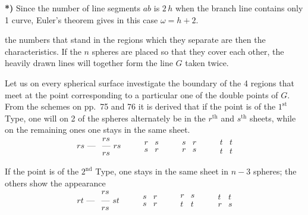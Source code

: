 \documentclass{article}
\begin{document}
\textbf{*)} Since the number of line segments $ab$ is $2\,h$ when the branch line contains only 1 curve, Euler's theorem gives in this case $\omega = h + 2$.

the numbers that stand in the regions which they separate are then the characteristics. If the $n$ spheres are placed so that they cover each other, the heavily drawn lines will together form the line $G$ taken twice.

Let us on every spherical surface investigate the boundary of the 4 regions that meet at the point corresponding to a particular one of the double points of $G$. From the schemes on pp.\ 75 and 76 it is derived that if the point is of the $1^{\text{st}}$ Type, one will on 2 of the spheres alternately be in the $r^{\text{th}}$ and $s^{\text{th}}$ sheets, while on the remaining ones one stays in the same sheet.
\[
\begin{array}{c|c}
& rs \\
rs\text{ ---} & \text{--- } rs \\
& rs
\end{array}
\qquad
\begin{array}{c||c}
r & s \\
\hline\hline
s & r
\end{array}
\qquad
\begin{array}{c||c}
s & r \\
\hline\hline
r & s
\end{array}
\qquad
\begin{array}{c|c}
t & t \\
\hline
t & t
\end{array}
\]

If the point is of the $2^{\text{nd}}$ Type, one stays in the same sheet in $n-3$ spheres; the others show the appearance
\[
\begin{array}{c|c}
& rs \\
rt\text{ ---} & \text{--- } st \\
& rs
\end{array}
\qquad
\begin{array}{c||c}
s & r \\
\hline
s & r
\end{array}
\qquad
\begin{array}{c|c}
r & s \\
\hline\hline
t & t
\end{array}
\qquad
\begin{array}{c|c}
t & t \\
\hline\hline
r & s
\end{array}
\]
\end{document}
